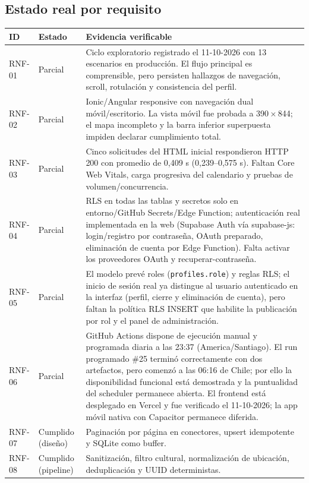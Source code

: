 \subsection{Estado real por requisito}

\begin{longtable}{l l p{9.3cm}}
\toprule
\textbf{ID} & \textbf{Estado} & \textbf{Evidencia verificable} \\
\midrule
\endhead
RNF-01 & Parcial & Ciclo exploratorio registrado el 11-10-2026 con 13 escenarios en producción. El flujo principal es comprensible, pero persisten hallazgos de navegación, scroll, rotulación y consistencia del perfil. \\
RNF-02 & Parcial & Ionic/Angular responsive con navegación dual móvil/escritorio. La vista móvil fue probada a 390\,$\times$\,844; el mapa incompleto y la barra inferior superpuesta impiden declarar cumplimiento total. \\
RNF-03 & Parcial & Cinco solicitudes del HTML inicial respondieron HTTP 200 con promedio de 0,409 s (0,239--0,575 s). Faltan Core Web Vitals, carga progresiva del calendario y pruebas de volumen/concurrencia. \\
RNF-04 & Parcial & RLS en todas las tablas y secretos solo en entorno/GitHub Secrets/Edge Function; autenticación real implementada en la web (Supabase Auth vía supabase-js: login/registro por contraseña, OAuth preparado, eliminación de cuenta por Edge Function). Falta activar los proveedores OAuth y recuperar-contraseña. \\
RNF-05 & Parcial & El modelo prevé roles (\texttt{profiles.role}) y reglas RLS; el inicio de sesión real ya distingue al usuario autenticado en la interfaz (perfil, cierre y eliminación de cuenta), pero faltan la política RLS INSERT que habilite la publicación por rol y el panel de administración. \\
RNF-06 & Parcial & GitHub Actions dispone de ejecución manual y programada diaria a las 23:37 (America/Santiago). El run programado \#25 terminó correctamente con dos artefactos, pero comenzó a las 06:16 de Chile; por ello la disponibilidad funcional está demostrada y la puntualidad del scheduler permanece abierta. El frontend está desplegado en Vercel y fue verificado el 11-10-2026; la app móvil nativa con Capacitor permanece diferida. \\
RNF-07 & Cumplido (diseño) & Paginación por página en conectores, upsert idempotente y SQLite como buffer. \\
RNF-08 & Cumplido (pipeline) & Sanitización, filtro cultural, normalización de ubicación, deduplicación y UUID deterministas. \\

\end{longtable}
